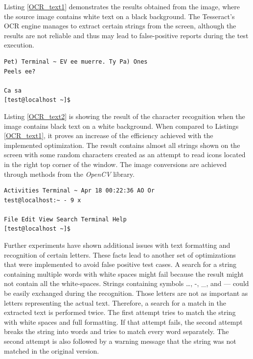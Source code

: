 Listing \ref{OCR_text1} demonstrates the results obtained from the image, where the source image contains white text on a black background. The Tesseract's OCR engine manages to extract certain strings from the screen, although the results are not reliable and thus may lead to false-positive reports during the test execution.  

\begin{lstlisting}[caption={Text generated from the binarized image in Figure \ref{ocr_conversion}},label={OCR_text1}]
Pet) Terminal ~ EV ee muerre. Ty Pa) Ones
Peels ee?

Ca sa
[test@localhost ~]$ 
\end{lstlisting}

Listing \ref{OCR_text2} is showing the result of the character recognition when the image contains black text on a white background. When compared to Listings \ref{OCR_text1}, it proves an increase of the efficiency achieved with the implemented optimization. The result contains almost all strings shown on the screen with some random characters created as an attempt to read icons located in the right top corner of the window. The image conversions are achieved through methods from the \textit{OpenCV} library. 

\begin{lstlisting}[caption={Text generated from the inverted binarized image in Figure \ref{ocr_conversion}},label={OCR_text2}]
 Activities Terminal ~ Apr 18 00:22:36 AO Or
test@localhost:~ - 9 x

File Edit View Search Terminal Help
[test@localhost ~]$
\end{lstlisting}

Further experiments have shown additional issues with text formatting and recognition of certain letters. These facts lead to another set of optimizations that were implemented to avoid false positive test cases. A search for a string containing multiple words with white spaces might fail because the result might not contain all the white-spaces. Strings containing symbols …, -, \_, and — could be easily exchanged during the recognition. Those letters are not as important as letters representing the actual text. Therefore, a search for a match in the extracted text is performed twice. The first attempt tries to match the string with white spaces and full formatting. If that attempt fails, the second attempt breaks the string into words and tries to match every word separately. The second attempt is also followed by a warning message that the string was not matched in the original version.


